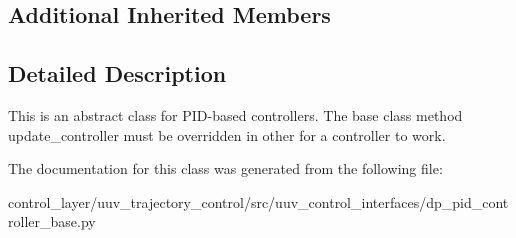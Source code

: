 \subsection*{Additional Inherited Members}


\subsection{Detailed Description}
\begin{DoxyVerb}This is an abstract class for PID-based controllers. The base class method
update_controller must be overridden in other for a controller to work.
\end{DoxyVerb}
 

The documentation for this class was generated from the following file\+:\begin{DoxyCompactItemize}
\item 
control\+\_\+layer/uuv\+\_\+trajectory\+\_\+control/src/uuv\+\_\+control\+\_\+interfaces/dp\+\_\+pid\+\_\+controller\+\_\+base.\+py\end{DoxyCompactItemize}
